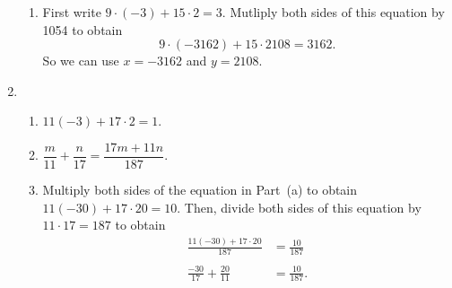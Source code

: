 \begin{enumerate}
\begin{enumerate}
\item First write $9 \cdot (-3) + 15 \cdot 2 = 3$.  Mutliply both sides of this equation by 1054 to obtain
\[
9 \cdot (-3162) + 15 \cdot 2108 = 3162.
\]
So we can use $x = -3162$ and $y = 2108$.
\end{enumerate}




\item \begin{enumerate}
\item $11 \left( -3 \right) + 17 \cdot 2 = 1$.

\item $\dfrac{m}{11} + \dfrac{n}{17} = \dfrac{17m + 11n}{187}$.

\item Multiply both sides of the equation in Part~(a) to obtain \\
$11 \left( -30 \right) + 17 \cdot 20 = 10$.  Then, divide both sides of this equation by 
$11 \cdot 17 = 187$ to obtain
\[
\begin{aligned}
\frac{11 \left( -30 \right) + 17 \cdot 20}{187} &= \frac{10}{187} \\
                                                & \\
                 \frac{-30}{17} + \frac{20}{11} &= \frac{10}{187}. \\
\end{aligned}
\]
\end{enumerate}
\end{enumerate}


